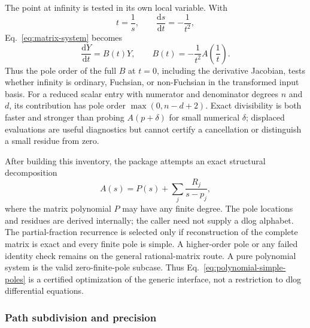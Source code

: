 \documentclass[11pt]{article}
\newcommand{\dd}{\mathrm d}
\begin{document}
The point at infinity is tested in its own local variable.  With
\begin{equation}
 t=\frac{1}{s},\qquad \frac{\dd s}{\dd t}=-\frac{1}{t^2},
\end{equation}
Eq.~\eqref{eq:matrix-system} becomes
\begin{equation}
 \frac{\dd Y}{\dd t}=B(t)Y,
 \qquad B(t)=-\frac{1}{t^2}A\!\left(\frac{1}{t}\right).
 \label{eq:infinity-transform}
\end{equation}
Thus the pole order of the full $B$ at $t=0$, including the derivative Jacobian, tests
whether infinity is ordinary, Fuchsian, or non-Fuchsian in the transformed input basis.
For a reduced scalar entry with numerator and denominator degrees $n$ and $d$, its
contribution has pole order $\max(0,n-d+2)$.  Exact divisibility is both faster and stronger
than probing $A(p+\delta)$ for small numerical $\delta$; displaced evaluations are useful
diagnostics but cannot certify a cancellation or distinguish a small residue from zero.

After building this inventory, the package attempts an exact structural decomposition
\begin{equation}
 A(s)=P(s)+\sum_j\frac{R_j}{s-p_j},
 \label{eq:polynomial-simple-poles}
\end{equation}
where the matrix polynomial $P$ may have any finite degree.  The pole locations and residues
are derived internally; the caller need not supply a dlog alphabet.  The partial-fraction
recurrence is selected only if reconstruction of the complete matrix is exact and every
finite pole is simple.  A higher-order pole or any failed identity check remains on the
general rational-matrix route.  A pure polynomial system is the valid zero-finite-pole
subcase.  Thus Eq.~\eqref{eq:polynomial-simple-poles} is a certified optimization of the
generic interface, not a restriction to dlog differential equations.

\subsubsection{Path subdivision and precision}
\label{subsec:path}
\end{document}
